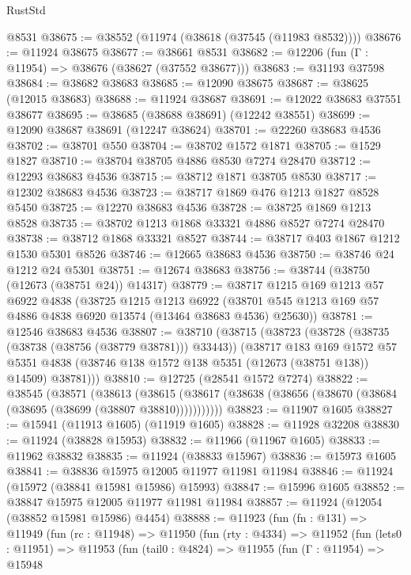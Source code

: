 \begin{lexlean}{RustStd}
\begin{coremodule}
    @8531
@38675 := @38552 (@11974 (@38618 (@37545 (@11983 @8532))))
@38676 := @11924 @38675
@38677 := @38661 @8531
@38682 := @12206 (fun (Γ : @11954) => @38676 (@38627 (@37552 @38677)))
@38683 := @31193 @37598
@38684 := @38682 @38683
@38685 := @12090 @38675
@38687 := @38625 (@12015 @38683)
@38688 := @11924 @38687
@38691 := @12022 @38683 @37551 @38677
@38695 := @38685 (@38688 @38691) (@12242 @38551)
@38699 := @12090 @38687 @38691 (@12247 @38624)
@38701 := @22260 @38683 @4536
@38702 := @38701 @550
@38704 := @38702 @1572 @1871
@38705 := @1529 @1827
@38710 := @38704 @38705 @4886 @8530 @7274 @28470
@38712 := @12293 @38683 @4536
@38715 := @38712 @1871 @38705 @8530
@38717 := @12302 @38683 @4536
@38723 := @38717 @1869 @476 @1213 @1827 @8528 @5450
@38725 := @12270 @38683 @4536
@38728 := @38725 @1869 @1213 @8528
@38735 := @38702 @1213 @1868 @33321 @4886 @8527 @7274 @28470
@38738 := @38712 @1868 @33321 @8527
@38744 := @38717 @403 @1867 @1212 @1530 @5301 @8526
@38746 := @12665 @38683 @4536
@38750 := @38746 @24 @1212 @24 @5301
@38751 := @12674 @38683
@38756 := @38744 (@38750 (@12673 (@38751 @24)) @14317)
@38779 := @38717
    @1215
    @169
    @1213
    @57
    @6922
    @4838
    (@38725
      @1215
      @1213
      @6922
      (@38701 @545 @1213 @169 @57 @4886 @4838 @6920 @13574 (@13464 @38683 @4536) @25630))
@38781 := @12546 @38683 @4536
@38807 := @38710
    (@38715
      (@38723
        (@38728 (@38735 (@38738 (@38756 (@38779 @38781))) @33443))
        (@38717
          @183
          @169
          @1572
          @57
          @5351
          @4838
          (@38746 @138 @1572 @138 @5351 (@12673 (@38751 @138)) @14509)
          @38781)))
@38810 := @12725 (@28541 @1572 @7274)
@38822 := @38545
    (@38571
      (@38613
        (@38615 (@38617 (@38638 (@38656 (@38670 (@38684 (@38695 (@38699 (@38807 @38810)))))))))))
@38823 := @11907 @1605
@38827 := @15941 (@11913 @1605) (@11919 @1605)
@38828 := @11928 @32208
@38830 := @11924 (@38828 @15953)
@38832 := @11966 (@11967 @1605)
@38833 := @11962 @38832
@38835 := @11924 (@38833 @15967)
@38836 := @15973 @1605
@38841 := @38836 @15975 @12005 @11977 @11981 @11984
@38846 := @11924 (@15972 (@38841 @15981 @15986) @15993)
@38847 := @15996 @1605
@38852 := @38847 @15975 @12005 @11977 @11981 @11984
@38857 := @11924 (@12054 (@38852 @15981 @15986) @4454)
@38888 := @11923
    (fun (fn : @131) =>
    @11949
      (fun (rc : @11948) =>
      @11950
        (fun (rty : @4334) =>
        @11952
          (fun (lets0 : @11951) =>
          @11953
            (fun (tail0 : @4824) =>
            @11955
              (fun (Γ : @11954) =>
              @15948

\end{coremodule}
\end{lexlean}
